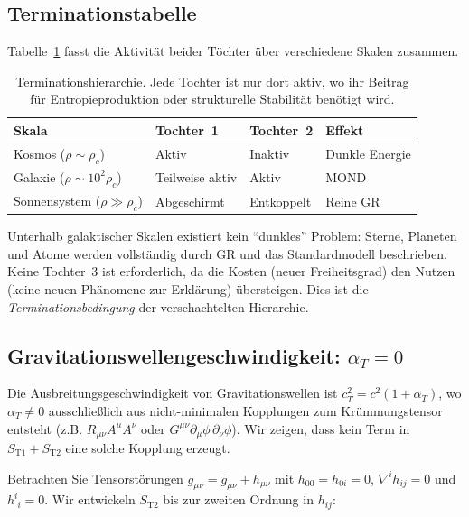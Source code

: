 \documentclass[aps,prd,twocolumn,superscriptaddress,nofootinbib]{revtex4-2}
\begin{document}
\subsection{Terminationstabelle}

Tabelle~\ref{tab:termination} fasst die Aktivit\"at beider T\"ochter \"uber verschiedene Skalen zusammen.

\begin{table}[tbp]
\caption{\label{tab:termination}Terminationshierarchie. Jede Tochter ist nur dort aktiv, wo ihr Beitrag f\"ur Entropieproduktion oder strukturelle Stabilit\"at ben\"otigt wird.}
\begin{ruledtabular}
\begin{tabular}{llll}
Skala & Tochter~1 & Tochter~2 & Effekt \\
\hline
Kosmos ($\rho \sim \rho_c$) & Aktiv & Inaktiv & Dunkle Energie \\
Galaxie ($\rho \sim 10^2\rho_c$) & Teilweise aktiv & Aktiv & MOND \\
Sonnensystem ($\rho \gg \rho_c$) & Abgeschirmt & Entkoppelt & Reine GR \\
\end{tabular}
\end{ruledtabular}
\end{table}

Unterhalb galaktischer Skalen existiert kein ``dunkles'' Problem: Sterne, Planeten und Atome werden vollst\"andig durch GR und das Standardmodell beschrieben. Keine Tochter~3 ist erforderlich, da die Kosten (neuer Freiheitsgrad) den Nutzen (keine neuen Ph\"anomene zur Erkl\"arung) \"ubersteigen. Dies ist die \textit{Terminationsbedingung} der verschachtelten Hierarchie.

\subsection{Gravitationswellengeschwindigkeit: $\alpha_T = 0$}
\label{sec:alpha_T}

Die Ausbreitungsgeschwindigkeit von Gravitationswellen ist $c_T^2 = c^2(1 + \alpha_T)$, wo $\alpha_T \neq 0$ ausschlie\ss{}lich aus nicht-minimalen Kopplungen zum Kr\"ummungstensor entsteht (z.B. $R_{\mu\nu}A^\mu A^\nu$ oder $G^{\mu\nu}\partial_\mu\phi\,\partial_\nu\phi$). Wir zeigen, dass kein Term in $S_{\mathrm{T1}} + S_{\mathrm{T2}}$ eine solche Kopplung erzeugt.

Betrachten Sie Tensorst\"orungen $g_{\mu\nu} = \bar{g}_{\mu\nu} + h_{\mu\nu}$ mit $h_{00} = h_{0i} = 0$, $\nabla^i h_{ij} = 0$ und $h^i_{\phantom{i}i} = 0$. Wir entwickeln $S_{\mathrm{T2}}$ bis zur zweiten Ordnung in $h_{ij}$:
\end{document}
